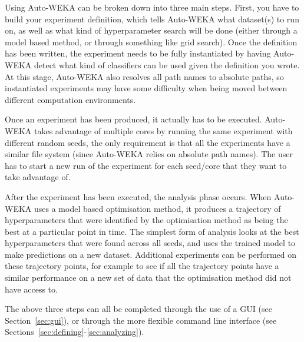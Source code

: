 
Using Auto-WEKA can be broken down into three main steps. First, you have to build your experiment definition, which tells Auto-WEKA what dataset(s) to run on, as well as what kind of hyperparameter search will be done (either through a model based method, or through something like grid search). Once the definition has been written, the experiment needs to be fully instantiated by having Auto-WEKA detect what kind of classifiers can be used given the definition you wrote. At this stage, Auto-WEKA also resolves all path names to absolute paths, so instantiated experiments may have some difficulty when being moved between different computation environments.  

Once an experiment has been produced, it actually has to be executed. Auto-WEKA takes advantage of multiple cores by running the same experiment with different random seeds, the only requirement is that all the experiments have a similar file system (since Auto-WEKA relies on absolute path names). The user has to start a new run of the experiment for each seed/core that they want to take advantage of.

After the experiment has been executed, the analysis phase occurs. When Auto-WEKA uses a model based optimisation method, it produces a trajectory of hyperparameters that were identified by the optimisation method as being the best at a particular point in time. The simplest form of analysis looks at the best hyperparameters that were found across all seeds, and uses the trained model to make predictions on a new dataset. Additional experiments can be performed on these trajectory points, for example to see if all the trajectory points have a similar performance on a new set of data that the optimisation method did not have access to.

The above three steps can all be completed through the use of a GUI (see Section~\ref{sec:gui}), or through the more flexible command line interface (see Sections~\ref{sec:defining}-\ref{sec:analyzing}).